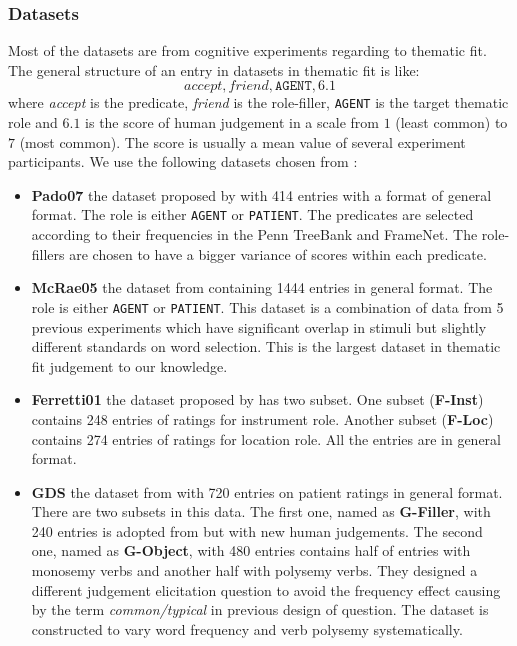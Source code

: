 \documentclass[a4paper]{article}
\begin{document}
\subsubsection{Datasets} \label{sec:dataset-thematic}
Most of the datasets are from cognitive experiments regarding to thematic fit. The general structure of an entry in datasets in thematic fit is like: 
\begin{equation} \label{eg:data-thematic}
    accept, friend, \texttt{AGENT}, 6.1
\end{equation}
where \textit{accept} is the predicate, \textit{friend} is the role-filler, \texttt{AGENT} is the target thematic role and $6.1$ is the score of human judgement in a scale from $1$ (least common) to $7$ (most common). The score is usually a mean value of several experiment participants. We use the following datasets chosen from \citet{sayeed2016thematic}: 
\begin{itemize}
\item \textbf{Pado07}       the dataset proposed by \citet{pado2007integration} with 414 entries with a format of general format. The role is either \texttt{AGENT} or \texttt{PATIENT}. The predicates are selected according to their frequencies in the Penn TreeBank and FrameNet. The role-fillers are chosen to have a bigger variance of scores within each predicate. 
\item   \textbf{McRae05}    the dataset from \citet{mcrae2005basis} containing 1444 entries in general format. The role is either \texttt{AGENT} or \texttt{PATIENT}. This dataset is a combination of data from 5 previous experiments which have significant overlap in stimuli but slightly different standards on word selection. This is the largest dataset in thematic fit judgement to our knowledge. 
\item   \textbf{Ferretti01} the dataset proposed by  \citet{ferretti2001integrating} has two subset. One subset (\textbf{F-Inst}) contains 248 entries of ratings for instrument role. Another subset (\textbf{F-Loc}) contains 274 entries of ratings for location role. All the entries are in general format. 
\item   \textbf{GDS}    the dataset from \citet{greenberg2015verb} with 720 entries on patient ratings in general format. There are two subsets in this data. The first one, named as \textbf{G-Filler}, with 240 entries is adopted from \citet{mcrae1998modeling} but with new human judgements. The second one, named as \textbf{G-Object}, with 480 entries contains half of entries with monosemy verbs and another half with polysemy verbs. They designed a different judgement elicitation question to avoid the frequency effect causing by the term \textit{common/typical} in previous design of question. The dataset is constructed to vary word frequency and verb polysemy systematically. 
\end{itemize}
\end{document}
